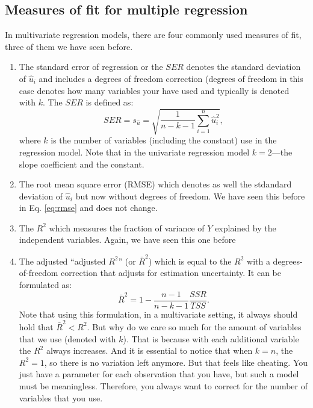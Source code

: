 \documentclass[
]{book}
\providecommand{\tightlist}{%
  \setlength{\itemsep}{0pt}\setlength{\parskip}{0pt}}
\begin{document}
\hypertarget{measures-of-fit-for-multiple-regression}{%
\subsection{Measures of fit for multiple regression}\label{measures-of-fit-for-multiple-regression}}

In multivariate regression models, there are four commonly used measures of fit, three of them we have seen before.

\begin{enumerate}
\def\labelenumi{\arabic{enumi}.}
\tightlist
\item
  The standard error of regression or the \(SER\) denotes the standard deviation of \(\hat{u}_i\) and includes a degrees of freedom correction (degrees of freedom in this case denotes how many variables your have used and typically is denoted with \(k\). The \(SER\) is defined as:
  \begin{equation}
  SER = s_{\hat{u}} = \sqrt{\frac{1}{n-k-1} \sum_{i=1}^n \hat{u}^2_i},
  \end{equation}
  where \(k\) is the number of variables (including the constant) use in the regression model. Note that in the univariate regression model \(k=2\)---the slope coefficient and the constant.
\item
  The root mean square error (RMSE) which denotes as well the stdandard deviation of \(\hat{u}_i\) but now without degrees of freedom. We have seen this before in Eq. \eqref{eq:rmse} and does not change.
\item
  The \(R^2\) which measures the fraction of variance of \(Y\) explained by the independent variables. Again, we have seen this one before
\item
  The adjusted ``adjusted \(R^2\)'' (or \(\bar{R}^2\)) which is equal to the \(R^2\) with a degrees-of-freedom correction that adjusts for estimation uncertainty. It can be formulated as:
  \begin{equation}
  \bar{R}^2 = 1 - \frac{n-1}{n-k-1}\frac{SSR}{TSS}.
  \end{equation}
  Note that using this formulation, in a multivariate setting, it always should hold that \(\bar{R}^2 <R^2\). But why do we care so much for the amount of variables that we use (denoted with \(k\)). That is because with each additional variable the \(R^2\) always increases. And it is essential to notice that when \(k=n\), the \(R^2 = 1\), so there is no variation left anymore. But that feels like cheating. You just have a parameter for each observation that you have, but such a model must be meaningless. Therefore, you always want to correct for the number of variables that you use.
\end{enumerate}
\end{document}
